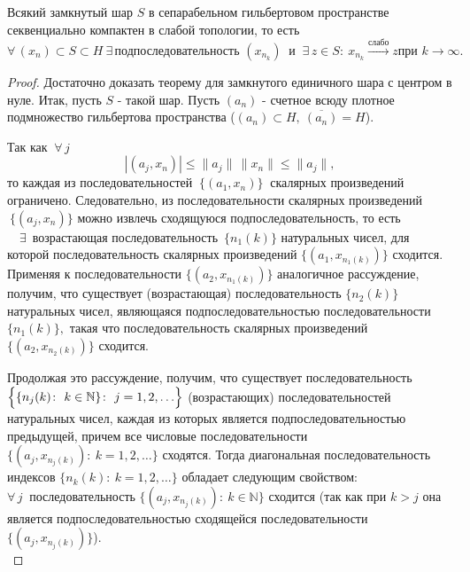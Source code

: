 \documentclass[a4paper]{article}
\begin{document}
\begin{theorem}
Всякий замкнутый шар $S$ в сепарабельном гильбертовом пространстве
секвенциально компактен в слабой топологии, то есть
$$
\forall \, (x_n)\subset S\subset H \ \exists\, \mbox{
подпоследовательность } (x_{n_k}) \ \mbox{ и } \ \exists\, z\in
S\colon \ x_{n_k} \stackrel{\mbox{слабо}}\longrightarrow z \mbox{
при } k\rightarrow\infty.
$$
\end{theorem}
\begin{proof}
Достаточно доказать теорему для замкнутого единичного шара с
центром в нуле. Итак, пусть $S$ - такой шар. Пусть $(a_n)$ -
счетное всюду плотное подмножество гильбертова пространства
($(a_n) \subset H, \ \overline{(a_n)} = H$).

Так как $\ \forall \, j$
$$
|(a_j, x_n)| \leqslant \|a_j\| \, \|x_n\| \leqslant \|a_j\|,
$$
то каждая из последовательностей $\ \{(a_1, x_n)\}\ $ скалярных
произведений ограничено. Следовательно, из последовательности
скалярных произведений $\ \{(a_j, x_n)\}$ можно извлечь сходящуюся
подпоследовательность, то есть\\

$\quad\exists \,$ возрастающая последовательность  $\, \{n_1
(k)\}$ натуральных чисел, для которой последовательность скалярных
произведений $\{(a_1, x_{n_1 (k)})\}$ сходится.\\

Применяя к последовательности $\{(a_2, x_{n_1 (k)})\}$ аналогичное
рассуждение, получим, что существует (возрастающая)
последовательность $\{n_2 (k)\}$ натуральных чисел, являющаяся
подпоследовательностью последовательности $\{n_1 (k)\},$ такая что
последовательность скалярных произведений $\{(a_2, x_{n_2 (k)})\}$
сходится.


Продолжая это рассуждение, получим, что существует
последовательность \linebreak
$\Bigl\{ \{ n_j (k)\colon \ k\in
\mathbb{N}\}\colon \ j= 1, 2, \ldots \Bigr\}$ (возрастающих)
последовательностей натуральных чисел, каждая из которых является
подпоследовательностью предыдущей, причем все числовые
последовательности $\{ (a_j, x_{n_j (k)})\colon \ k = 1, 2,
\ldots\}$ сходятся. Тогда диагональная последовательность индексов
$\{n_k (k)\colon \ k=1,2,\ldots\}$ обладает следующим свойством:\\

$\forall \, j \ $ последовательность $\{ (a_j, x_{n_j (k)})\colon
\ k \in \mathbb{N}\}$ сходится (так как при $k > j$ она является
подпоследовательностью сходящейся последовательности $\{(a_j,
x_{n_j (k)})\}$).\\


\end{proof}
\end{document}
